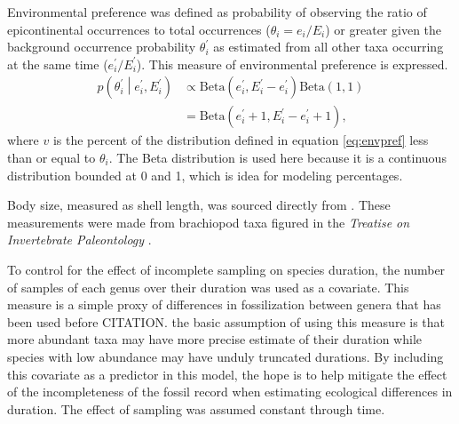 \documentclass[11pt]{article}
\begin{document}
Environmental preference was defined as probability of observing the ratio of epicontinental occurrences to total occurrences (\(\theta_{i} = e_{i} / E_{i}\)) or greater given the background occurrence probability \(\theta^{\prime}_{i}\) as estimated from all other taxa occurring at the same time (\(e^{\prime}_{i} / E^{\prime}_{i}\)). This measure of environmental preference is expressed.
\begin{equation}
  \begin{aligned}
    p\left(\theta^{\prime}_{i} \middle| e^{\prime}_{i}, E^{\prime}_{i} \right) &\propto \mathrm{Beta}(e^{\prime}_{i}, E^{\prime}_{i} - e^{\prime}_{i}) \mathrm{Beta}(1, 1) \\
    &= \mathrm{Beta}(e^{\prime}_{i} + 1, E^{\prime}_{i} - e^{\prime}_{i} + 1),
  \end{aligned}
  \label{eq:envpref}
\end{equation}
where \(v\) is the percent of the distribution defined in equation \ref{eq:envpref} less than or equal to \(\theta_{i}\). The Beta distribution is used here because it is a continuous distribution bounded at 0 and 1, which is idea for modeling percentages.

Body size, measured as shell length, was sourced directly from \citet{Payne2014}. These measurements were made from brachiopod taxa figured in the \textit{Treatise on Invertebrate Paleontology} \citep{Brunton2007}.

To control for the effect of incomplete sampling on species duration, the number of samples of each genus over their duration was used as a covariate. This measure is a simple proxy of differences in fossilization between genera that has been used before CITATION. the basic assumption of using this measure is that more abundant taxa may have more precise estimate of their duration while species with low abundance may have unduly truncated durations. By including this covariate as a predictor in this model, the hope is to help mitigate the effect of the incompleteness of the fossil record when estimating ecological differences in duration. The effect of sampling was assumed constant through time. 

\end{document}

